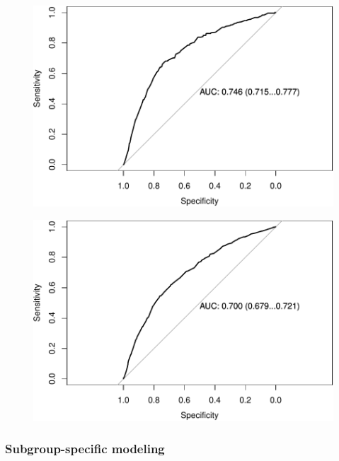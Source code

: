 \documentclass[11pt,]{article}
\begin{document}
\begin{figure}[htbp]
\centering
\includegraphics{report2_files/figure-latex/plot-hac2004-1.pdf}
\caption{}
\end{figure}

\begin{figure}[htbp]
\centering
\includegraphics{report2_files/figure-latex/plot-doc2004-1.pdf}
\caption{}
\end{figure}

\subsubsection{Subgroup-specific
modeling}\label{subgroup-specific-modeling}
\end{document}
